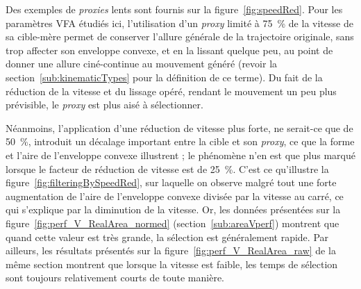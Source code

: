 	Des exemples de \emph{proxies} lents sont fournis sur la figure~\ref{fig:speedRed}. Pour les paramètres VFA étudiés ici, l'utilisation d'un \emph{proxy} limité à 75~\%{} de la vitesse de sa cible-mère permet de conserver l'allure générale de la trajectoire originale, sans trop affecter son enveloppe convexe, et en la lissant quelque peu, au point de donner une allure ciné-continue au mouvement généré (revoir la section~\ref{sub:kinematicTypes} pour la définition de ce terme). Du fait de la réduction de la vitesse et du lissage opéré, rendant le mouvement un peu plus prévisible, le \emph{proxy} est plus aisé à sélectionner.
	
	Néanmoins, l'application d'une réduction de vitesse plus forte, ne serait-ce que de 50~\%{}, introduit un décalage important entre la cible et son \emph{proxy}, ce que la forme et l'aire de l'enveloppe convexe illustrent ; le phénomène n'en est que plus marqué lorsque le facteur de réduction de vitesse est de 25~\%{}. C'est ce qu'illustre la figure~\ref{fig:filteringBySpeedRed}, sur laquelle on observe malgré tout une forte augmentation de l'aire de l'enveloppe convexe divisée par la vitesse au carré, ce qui s'explique par la diminution de la vitesse. Or, les données présentées sur la figure~\ref{fig:perf_V_RealArea_normed} (section~\ref{sub:areaVperf}) montrent que quand cette valeur est très grande, la sélection est généralement rapide. Par ailleurs, les résultats présentés sur la figure~\ref{fig:perf_V_RealArea_raw} de la même section montrent que lorsque la vitesse est faible, les temps de sélection sont toujours relativement courts de toute manière.



